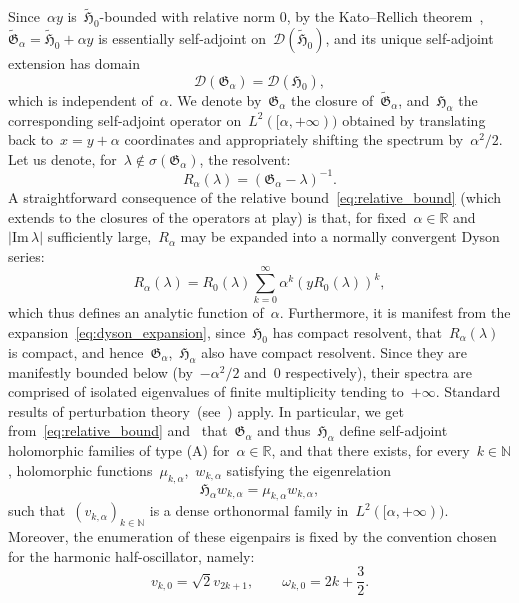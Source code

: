 \documentclass[10pt]{article}
\newcommand{\R}{\mathbb{R}}
\newcommand{\N}{\mathbb N}
\newcommand{\1}{\mathbbm 1}
\begin{document}
    Since~$\alpha y$ is~$\widetilde{\mathfrak H}_0$-bounded with relative norm 0, by the Kato--Rellich theorem~\cite[Theorem 6.4]{T14},~$\widetilde{\mathfrak{G}}_\alpha=\widetilde{\mathfrak H}_0 + \alpha y$ is essentially self-adjoint on~$\mathcal D({\widetilde{\mathfrak{H}}}_0)$, and its unique self-adjoint extension has domain
    \[\mathcal D(\mathfrak{G}_\alpha) = \mathcal D({\mathfrak{H}_0}),\]
    which is independent of~$\alpha$.
    We denote by~$\mathfrak{G}_\alpha$ the closure of~${\widetilde{\mathfrak{G}}}_\alpha$, and~$\mathfrak{H}_\alpha$ the corresponding self-adjoint operator on~$L^2([\alpha,+\infty))$ obtained by translating back to~$x=y+\alpha$ coordinates and appropriately shifting the spectrum by~$\alpha^2/2$.
    Let us denote, for~$\lambda\not\in \sigma\left(\mathfrak{G}_\alpha\right)$, the resolvent:
    \[R_{\alpha}(\lambda) = \left(\mathfrak{G}_\alpha-\lambda\right)^{-1}.\]
    A straightforward consequence of the relative bound~\eqref{eq:relative_bound} (which extends to the closures of the operators at play) is that, for fixed~$\alpha\in \R$ and~$|\mathrm{Im}\,\lambda|$ sufficiently large,~$R_{\alpha}$ may be expanded into a normally convergent Dyson series:
    \begin{equation}
        \label{eq:dyson_expansion}
       R_{\alpha}(\lambda) = R_0(\lambda)\sum_{k=0}^\infty \alpha^k \left(y R_0(\lambda)\right)^k,
    \end{equation}
    which thus defines an analytic function of~$\alpha$. Furthermore, it is manifest from the expansion~\eqref{eq:dyson_expansion}, since~${\mathfrak H}_0$ has compact resolvent, that~$R_\alpha(\lambda)$ is compact, and hence~${\mathfrak G}_\alpha$,~${\mathfrak H}_\alpha$ also have compact resolvent. Since they are manifestly bounded below (by~$-\alpha^2/2$ and~$0$ respectively), their spectra are comprised of isolated eigenvalues of finite multiplicity tending to~$+\infty$.
    Standard results of perturbation theory~(see~\cite[Chapter VII]{K95}) apply. In particular, we get from~\eqref{eq:relative_bound} and~\cite[Theorem VII.2.6,Theorem VII.3.9]{K95} that~${\mathfrak G}_\alpha$ and thus~${\mathfrak H}_\alpha$ define self-adjoint holomorphic families of type (A) for~$\alpha\in\R$, and that there exists, for every~$k\in\N$, holomorphic functions~$\mu_{k,\alpha}$,~$w_{k,\alpha}$ satisfying the eigenrelation
    \begin{equation}
        \label{eq:holomorphic_eigensytem}
        {\mathfrak{H}}_\alpha w_{k,\alpha} = \mu_{k,\alpha} w_{k,\alpha},
    \end{equation}
    such that~$(v_{k,\alpha})_{k\in \N}$ is a dense orthonormal family in~$L^2([\alpha,+\infty))$. Moreover, the enumeration of these eigenpairs is fixed by the convention chosen for the harmonic half-oscillator, namely:
    \[v_{k,0} = \sqrt 2 v_{2k+1},\qquad \omega_{k,0} = 2k + \frac32.\]
\end{document}
